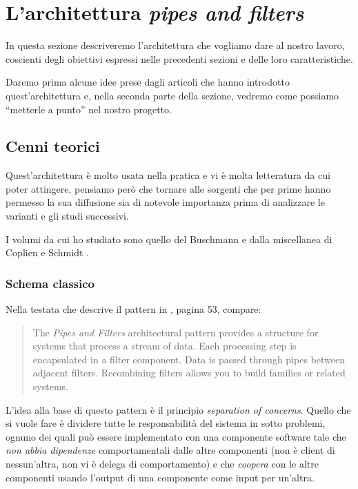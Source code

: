 \section{L'architettura \emph{pipes and filters}}

In questa sezione descriveremo l'architettura che vogliamo dare al
nostro lavoro, coscienti degli obiettivi espressi nelle precedenti
sezioni e delle loro caratteristiche.

Daremo prima alcune idee prese dagli articoli che hanno introdotto
quest'architettura e, nella seconda parte della sezione, vedremo come
possiamo ``metterle a punto'' nel nostro progetto.

\subsection{Cenni teorici}
Quest'architettura \`e molto usata nella pratica e vi \`e molta
letteratura da cui poter attingere, pensiamo per\`o che tornare alle
sorgenti che per prime hanno permesso la sua diffusione sia di
notevole importanza prima di analizzare le varianti e gli studi
successivi.

I volumi da cui ho studiato sono quello del Buschmann \cite{POSA} e
dalla miscellanea di Coplien e Schmidt \cite{PLOPD}.

\subsubsection{Schema classico}
Nella testata che descrive il pattern in \cite{POSA}, pagina 53,
compare:
\begin{quotation}
  The \emph{Pipes and Filters} architectural pattern provides a
  structure for systems that process a stream of data. Each processing
  step is encapsulated in a filter component. Data is passed through
  pipes between adjacent filters. Recombining filters allows you to
  build families or related systems.
\end{quotation}
L'idea alla base di questo pattern \`e il principio \emph{separation
  of concerns}. Quello che si vuole fare \`e dividere tutte le
responsabilit\`a del sistema in sotto problemi, ognuno dei quali pu\`o
essere implementato con una componente software tale che \emph{non
  abbia dipendenze} comportamentali dalle altre componenti (non \`e
client di nessun'altra, non vi \`e delega di comportamento) e che
\emph{coopera} con le altre componenti usando l'output di una
componente come input per un'altra.

